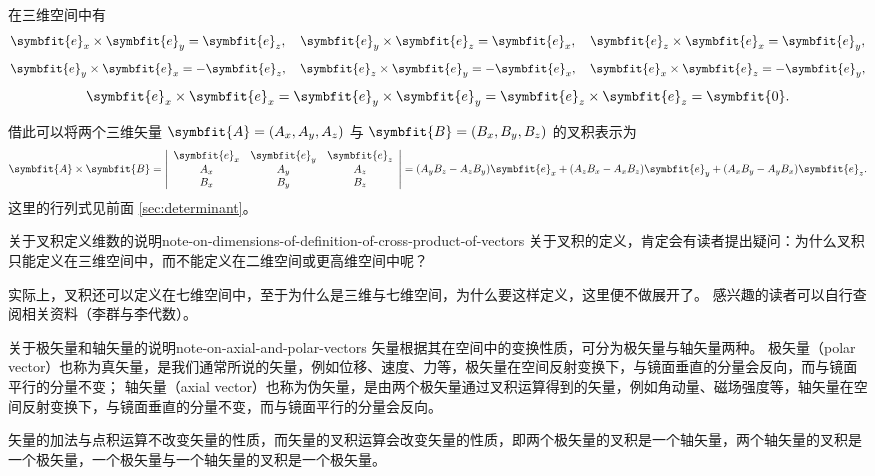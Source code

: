 在三维空间中有
\begin{equation}
    \symbfit{e}_x \times \symbfit{e}_y = \symbfit{e}_z , \quad \symbfit{e}_y \times \symbfit{e}_z = \symbfit{e}_x , \quad \symbfit{e}_z \times \symbfit{e}_x = \symbfit{e}_y ,
\end{equation}
\begin{equation}
    \symbfit{e}_y \times \symbfit{e}_x = -\symbfit{e}_z , \quad \symbfit{e}_z \times \symbfit{e}_y = -\symbfit{e}_x , \quad \symbfit{e}_x \times \symbfit{e}_z = -\symbfit{e}_y ,
\end{equation}
\begin{equation}
    \symbfit{e}_x \times \symbfit{e}_x = \symbfit{e}_y \times \symbfit{e}_y = \symbfit{e}_z \times \symbfit{e}_z = \symbfit{0} .
\end{equation}

借此可以将两个三维矢量 $ \symbfit{A} = (A_x , A_y , A_z) $ 与 $ \symbfit{B} = (B_x , B_y , B_z) $ 的叉积表示为
\begin{equation}
    \symbfit{A} \times \symbfit{B} = \left| \begin{array}{ccc}
        \symbfit{e}_x & \symbfit{e}_y & \symbfit{e}_z \\
        A_x           & A_y           & A_z           \\
        B_x           & B_y           & B_z
    \end{array} \right| = (A_y B_z - A_z B_y) \symbfit{e}_x + (A_z B_x - A_x B_z) \symbfit{e}_y + (A_x B_y - A_y B_x) \symbfit{e}_z .
\end{equation}
这里的行列式见前面 \cref{sec:determinant}。

\begin{note}{关于叉积定义维数的说明}{note-on-dimensions-of-definition-of-cross-product-of-vectors}
    关于叉积的定义，肯定会有读者提出疑问：为什么叉积只能定义在三维空间中，而不能定义在二维空间或更高维空间中呢？

    实际上，叉积还可以定义在七维空间中，至于为什么是三维与七维空间，为什么要这样定义，这里便不做展开了。
    感兴趣的读者可以自行查阅相关资料（李群与李代数）。
\end{note}

\begin{note}{关于极矢量和轴矢量的说明}{note-on-axial-and-polar-vectors}
    矢量根据其在空间中的变换性质，可分为极矢量与轴矢量两种。
    极矢量（polar vector）也称为真矢量，是我们通常所说的矢量，例如位移、速度、力等，极矢量在空间反射变换下，与镜面垂直的分量会反向，而与镜面平行的分量不变；
    轴矢量（axial vector）也称为伪矢量，是由两个极矢量通过叉积运算得到的矢量，例如角动量、磁场强度等，轴矢量在空间反射变换下，与镜面垂直的分量不变，而与镜面平行的分量会反向。

    矢量的加法与点积运算不改变矢量的性质，而矢量的叉积运算会改变矢量的性质，即两个极矢量的叉积是一个轴矢量，两个轴矢量的叉积是一个极矢量，一个极矢量与一个轴矢量的叉积是一个极矢量。
\end{note}

